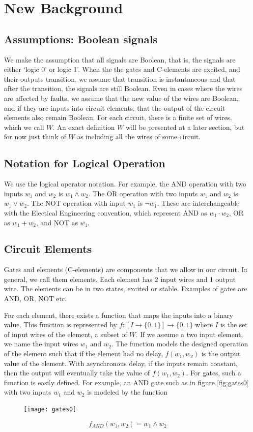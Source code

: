 \documentclass[12pt]{report}
\begin{document}
\chapter{New Background}
\section{Assumptions:  Boolean signals}
We make the assumption that all signals are Boolean, that is, the signals are either `logic 0' or logic 1'.  When the the gates and C-elements are excited, and their outputs transition, we assume that transition is instantaneous and that after the transition, the signals are still Boolean.   
Even in cases where the wires are affected by faults, we assume that the new value of the wires are Boolean, and if they are inputs into circuit elements, that the output of the circuit elements also remain Boolean.  For each circuit, there is a finite set of wires, which we call $W$.  An exact definition $W$ will be presented at a later section, but for now just think of $W$ as including all the wires of some circuit.

\section{Notation for Logical Operation}
We use the logical operator notation.  For example, the AND operation with two inputs $w_1$ and $w_2$ is $w_1\wedge w_2$.
The OR operation with two inputs $w_1$ and $w_2$ is $w_1\vee w_2$.  The NOT operation with input $w_1$ is $\neg w_1$.  These are interchangeable with the Electical Engineering convention, which represent AND as $w_1\cdot w_2$, OR as $w_1+w_2$, and NOT as $\overline{w_1}$.

\section{Circuit Elements}
Gates and elements (C-elements) are components that we allow in our circuit.  In general, we call them elements.  Each element has 2 input wires and 1 output wire.  The elements can be in two states, excited or stable.  Examples of gates are AND, OR, NOT etc.

For each element, there exists a function that maps the inputs into a binary value.  This function is represented by $f:[I \to \{0,1\}] \to \{0,1\}$ where $I$ is the set of input wires of the element, a subset of $W$.  If we assume a two input element, we name the input wires $w_1$ and $w_2$.  The function models the designed operation of the element such that if the element had no delay, $f(w_1,w_2)$ is the output value of the element.  With asynchronous delay, if the inputs remain constant, then the output will eventually take the value of $f(w_1,w_2)$.  For gates, such a function is easily defined.  For example, an AND gate such as in figure \ref{fig:gates0} with two inputs $w_1$ and $w_2$ is modeled by the function 
\begin{figure}[h]
\centering
\texttt{[image: gates0]}
\end{figure}
\[
f_{AND}(w_1,w_2)= w_1\wedge w_2
\]
\end{document}
